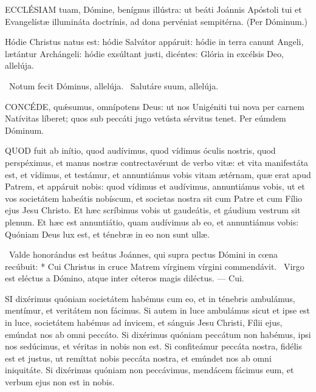 
\lettrine[lines=2]{E}{CCLÉSIAM} tuam, Dómine, benígnus illústra: ut beáti Joánnis Apóstoli tui et Evangelístæ illumináta doctrínis, ad dona pervéniat sempitérna. (Per Dóminum.)


 Hódie Christus natus est: hódie Salvátor appáruit: hódie in terra canunt Angeli, lætántur Archángeli: hódie exsúltant justi, dicéntes: Glória in excélsis Deo, allelúja.

\V\ Notum fecit Dóminus, allelúja. \R\ Salutáre suum, allelúja.


\lettrine[lines=2]{C}{ONCÉDE}, quǽsumus, omnípotens Deus: ut nos Unigéniti tui nova per carnem Natívitas líberet; quos sub peccáti jugo vetústa sérvitus tenet. Per eúmdem Dóminum.




\lettrine[lines=2]{Q}{UOD} fuit ab inítio, quod audívimus, quod vídimus óculis nostris, quod perspéximus, et manus nostræ contrectavérunt de verbo vitæ: et vita manifestáta est, et vídimus, et testámur, et annuntiámus vobis vitam ætérnam, quæ erat apud Patrem, et appáruit nobis: quod vídimus et audívimus, annuntiámus vobis, ut et vos societátem habeátis nobíscum, et societas nostra sit cum Patre et cum Fílio ejus Jesu Christo. Et hæc scríbimus vobis ut gaudeátis, et gáudium vestrum sit plenum. Et hæc est annuntiátio, quam audívimus ab eo, et annuntiámus vobis: Quóniam Deus lux est, et ténebræ in eo non sunt ullæ.

\R\ Valde honorándus est beátus Joánnes, qui supra pectus Dómini in cœna recúbuit: * Cui Christus in cruce Matrem vírginem vírgini commendávit. \V\ Virgo est eléctus a Dómino, atque inter céteros magis diléctus. --- Cui.


\lettrine[lines=2]{S}{I} dixérimus quóniam societátem habémus cum eo, et in ténebris ambulámus, mentímur, et veritátem non fácimus. Si autem in luce ambulámus sicut et ipse est in luce, societátem habémus ad ínvicem, et sánguis Jesu Christi, Fílii ejus, emúndat nos ab omni peccáto. Si dixérimus quóniam peccátum non habémus, ipsi nos sedúcimus, et véritas in nobis non est. Si confiteámur peccáta nostra, fidélis est et justus, ut remíttat nobis peccáta nostra, et emúndet nos ab omni iniquitáte. Si dixérimus quóniam non peccávimus, mendácem fácimus eum, et verbum ejus non est in nobis.

